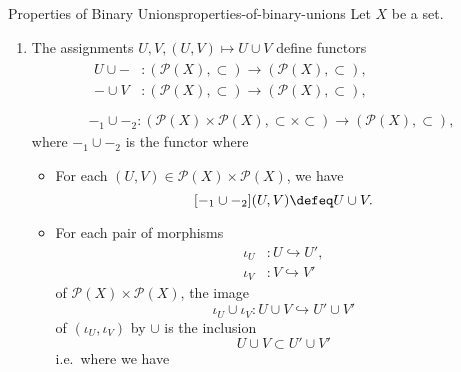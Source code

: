 \begin{proposition}{Properties of Binary Unions}{properties-of-binary-unions}%
    Let $X$ be a set.
    \begin{enumerate}
        \item\label{properties-of-binary-unions-functoriality}The assignments $U,V,(U,V)\mapsto U\cup V$ define functors
            \begin{gather*}
                \begin{aligned}
                    U\cup-         &\colon (\mathcal{P}(X),\subset)                                  \to (\mathcal{P}(X),\subset),\\
                    -\cup V        &\colon (\mathcal{P}(X),\subset)                                  \to (\mathcal{P}(X),\subset),\\
                \end{aligned}\\
                -_{1}\cup-_{2} \colon (\mathcal{P}(X)\times\mathcal{P}(X),\subset\times\subset) \to (\mathcal{P}(X),\subset),
            \end{gather*}
            where $-_{1}\cup-_{2}$ is the functor where
            \begin{itemize}
                \item{}For each $(U,V)\in\mathcal{P}(X)\times\mathcal{P}(X)$, we have
                    \[
                        [-_{1}\cup-_{2}](U,V)%
                        \defeq
                        U\cup V.%
                    \]%
                \item{}For each pair of morphisms
                    \begin{align*}
                        \iota_{U} &\colon U\hookrightarrow U',\\
                        \iota_{V} &\colon V\hookrightarrow V'
                    \end{align*}
                    of $\mathcal{P}(X)\times\mathcal{P}(X)$, the image
                    \[
                        \iota_{U}\cup\iota_{V}%
                        \colon%
                        U\cup V%
                        \hookrightarrow%
                        U'\cup V'%
                    \]%
                    of $(\iota_{U},\iota_{V})$ by $\cup$ is the inclusion
                    \[
                        U\cup V%
                        \subset%
                        U'\cup V'%
                    \]%
                    i.e.\ where we have

\end{itemize}
\end{enumerate}
\end{proposition}
